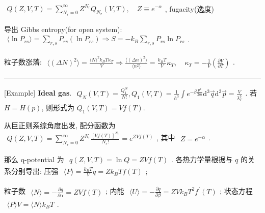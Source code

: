 \documentclass[../../main.tex]{subfiles}
\begin{document}
$\begin{aligned}
    Q(Z,V,T) = \sum_{N_{r}=0}^{\infty}Z^{N_{r}}Q_{N_{r}}(V,T),\quad Z \equiv e^{-\alpha}
\end{aligned}$,  fugacity(逸度)

导出 Gibbs entropy(for open system): $\begin{aligned}
    \langle \ln{P_{rs}}\rangle = \sum_{r,s}P_{rs}(\ln{P_{rs}})\Rightarrow S = -k_{B}\sum_{r,s}P_{rs}\ln{P_{rs}}
\end{aligned}$. 

粒子数涨落: $\begin{aligned}
    \langle(\Delta N)^{2}\rangle = \frac{\langle N\rangle^{2}k_{B}T\kappa_{T}}{V}
    \Rightarrow \frac{\langle (\Delta n)^{2}\rangle}{\langle n^{2}\rangle} = \frac{k_{B}T}{V}\kappa_{T},\quad \kappa_{T} = -\frac{1}{V}\left(\frac{\partial V}{\partial T}\right)
\end{aligned}$.

\vspace{0.5em}\hrule\vspace{0.5em}

[Example] \textbf{Ideal gas}. $\begin{aligned}
    Q_{N}(V,T) = \frac{Q_{1}^{N}}{N!}, Q_{1}(V,T) = \frac{1}{h^{3}}\int e^{-\beta \frac{p^{2}}{2m}}\mathrm{d}^{3}\vec{q}\mathrm{d}^{3}\vec{p} = \frac{V}{\lambda_{T}^{3}}
\end{aligned}$. 若 $H = H(p)$, 则形式为 
$Q_{1}(V,T) = Vf(T)$. 

从巨正则系综角度出发, 配分函数为 $\begin{aligned}
    Q(Z,V,T) = \sum_{N_{r}=0}^{\infty}Z^{N_{r}}\frac{[Vf(T)]^{N_{r}}}{N_{r}!} = e^{ZVf(T)}
\end{aligned}$, 其中 $\begin{aligned}
    Z = e^{-\alpha}
\end{aligned}$. 

那么 q-potential 为 $\begin{aligned}
    q(Z,V,T) = \ln{Q} = ZVf(T)
\end{aligned}$. 各热力学量根据与 $q$ 的关系分别导出: 压强 $\begin{aligned}
    \langle P\rangle = \frac{k_{B}T}{V}q = Zk_{B}Tf(T)
\end{aligned}$; 

粒子数 $\begin{aligned}
    \langle N\rangle = -\frac{\partial q}{\partial\alpha} = ZVf(T)
\end{aligned}$; 内能 $\begin{aligned}
    \langle U\rangle = -\frac{\partial q}{\partial\beta} = ZVk_{B}T^{2}f^{\prime}(T)
\end{aligned}$; 状态方程 $\begin{aligned}
    \langle P\rangle V = \langle N\rangle k_{B}T
\end{aligned}$. 
\end{document}
